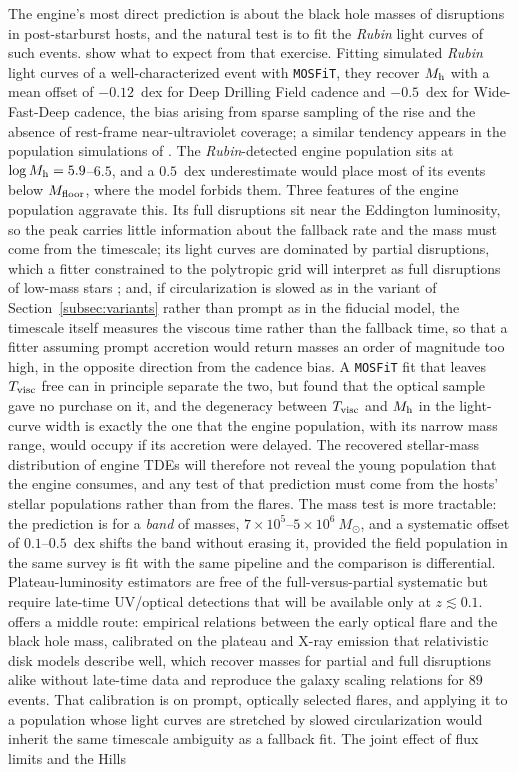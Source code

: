 \documentclass[twocolumn,pdftex]{aastex701}
\newcommand{\msun}{M_{\odot}\xspace}
\newcommand{\mosfit}{{\tt MOSFiT}\xspace}
\newcommand{\lsst}{{\it Rubin}\xspace}
\begin{document}
The engine's most direct prediction is about the black hole masses of disruptions in post-starburst hosts, and the natural test is to fit the \lsst light curves of such events. \citet{Angus:2026a} show what to expect from that exercise. Fitting simulated \lsst light curves of a well-characterized event with \mosfit, they recover $M_{\rm h}$ with a mean offset of $-0.12$~dex for Deep Drilling Field cadence and $-0.5$~dex for Wide-Fast-Deep cadence, the bias arising from sparse sampling of the rise and the absence of rest-frame near-ultraviolet coverage; a similar tendency appears in the population simulations of \citet{Magill:2026a}. The \lsst-detected engine population sits at $\log M_{\rm h} = 5.9$--$6.5$, and a $0.5$~dex underestimate would place most of its events below $M_{\rm floor}$, where the model forbids them. Three features of the engine population aggravate this. Its full disruptions sit near the Eddington luminosity, so the peak carries little information about the fallback rate and the mass must come from the timescale; its light curves are dominated by partial disruptions, which a fitter constrained to the polytropic grid will interpret as full disruptions of low-mass stars \citep{Angus:2026a}; and, if circularization is slowed as in the variant of Section~\ref{subsec:variants} rather than prompt as in the fiducial model, the timescale itself measures the viscous time rather than the fallback time, so that a fitter assuming prompt accretion would return masses an order of magnitude too high, in the opposite direction from the cadence bias. A \mosfit fit that leaves $T_{\rm visc}$ free can in principle separate the two, but \citet{Mockler:2019a} found that the optical sample gave no purchase on it, and the degeneracy between $T_{\rm visc}$ and $M_{\rm h}$ in the light-curve width is exactly the one that the engine population, with its narrow mass range, would occupy if its accretion were delayed. The recovered stellar-mass distribution of engine TDEs will therefore not reveal the young population that the engine consumes, and any test of that prediction must come from the hosts' stellar populations \citep{Mockler:2022a} rather than from the flares. The mass test is more tractable: the prediction is for a {\it band} of masses, $7 \times 10^{5}$--$5 \times 10^{6}~\msun$, and a systematic offset of $0.1$--$0.5$~dex shifts the band without erasing it, provided the field population in the same survey is fit with the same pipeline and the comparison is differential. Plateau-luminosity estimators \citep{Mummery:2024a,Mummery:2025a} are free of the full-versus-partial systematic but require late-time UV/optical detections that will be available only at $z \lesssim 0.1$. \citet{Mummery:2026a} offers a middle route: empirical relations between the early optical flare and the black hole mass, calibrated on the plateau and X-ray emission that relativistic disk models describe well, which recover masses for partial and full disruptions alike without late-time data and reproduce the galaxy scaling relations for $89$ events. That calibration is on prompt, optically selected flares, and applying it to a population whose light curves are stretched by slowed circularization would inherit the same timescale ambiguity as a fallback fit. The joint effect of flux limits and the Hills 
\end{document}
